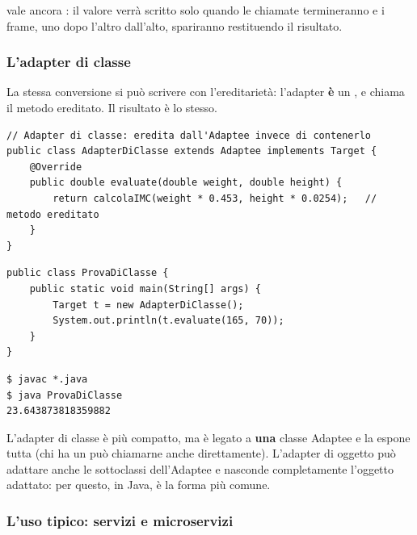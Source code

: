  vale ancora : il valore verrà scritto solo quando le chiamate termineranno e i frame, uno dopo
l'altro dall'alto, spariranno restituendo il risultato.

\subsubsection*{L'adapter di classe}

La stessa conversione si può scrivere con l'ereditarietà: l'adapter \textbf{è} un , e chiama il metodo
ereditato. Il risultato è lo stesso.

\begin{lstlisting}[style=java, name=AdapterDiClasse.java]
// Adapter di classe: eredita dall'Adaptee invece di contenerlo
public class AdapterDiClasse extends Adaptee implements Target {
    @Override
    public double evaluate(double weight, double height) {
        return calcolaIMC(weight * 0.453, height * 0.0254);   // metodo ereditato
    }
}
\end{lstlisting}
\noindent\begin{minipage}[t]{0.55\textwidth}
\begin{lstlisting}[style=java, name=ProvaDiClasse.java]
public class ProvaDiClasse {
    public static void main(String[] args) {
        Target t = new AdapterDiClasse();
        System.out.println(t.evaluate(165, 70));
    }
}
\end{lstlisting}
\end{minipage}\hfill
\begin{minipage}[t]{0.42\textwidth}
\begin{lstlisting}[style=shell, name=Terminale]
$ javac *.java
$ java ProvaDiClasse
23.643873818359882
\end{lstlisting}
\end{minipage}

\medskip
L'adapter di classe è più compatto, ma è legato a \textbf{una} classe Adaptee e la espone tutta (chi ha un
 può chiamarne anche  direttamente). L'adapter di oggetto può adattare anche le
sottoclassi dell'Adaptee e nasconde completamente l'oggetto adattato: per questo, in Java, è la forma più comune.

\subsubsection*{L'uso tipico: servizi e microservizi}

